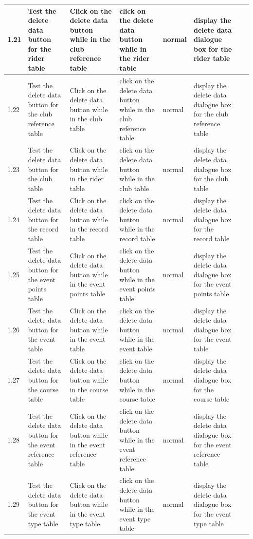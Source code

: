 \begin{landscape}
\begin{center}
\begin{longtable}{|p{1.5cm}|p{2.5cm}|p{2.5cm}|p{2cm}|p{2cm}|p{2cm}|p{2cm}|p{2cm}|}
        1.21 & Test the delete data button for the rider table & Click on the delete data button while in the club reference table & click on the delete data button while in the rider table & normal & display the delete data dialogue box for the rider table & & \\ \hline
        1.22 & Test the delete data button for the club reference table & Click on the delete data button while in the club table & click on the delete data button while in the club reference table & normal & display the delete data dialogue box for the club reference table & & \\ \hline
        1.23 & Test the delete data button for the club  table & Click on the delete data button while in the rider table & click on the delete data button while in the club table & normal & display the delete data dialogue box for the club  table & & \\ \hline
        1.24 & Test the delete data button for the record  table & Click on the delete data button while in the record table & click on the delete data button while in the record table & normal & display the delete data dialogue box for the record  table & & \\ \hline
        1.25 & Test the delete data button for the event points  table & Click on the delete data button while in the event points table & click on the delete data button while in the event points table & normal & display the delete data dialogue box for the event points  table & & \\ \hline
        1.26 & Test the delete data button for the event  table & Click on the delete data button while in the event table & click on the delete data button while in the event table & normal & display the delete data dialogue box for the event  table & & \\ \hline
        1.27 & Test the delete data button for the course  table & Click on the delete data button while in the course table & click on the delete data button while in the course table & normal & display the delete data dialogue box for the course  table & & \\ \hline
        1.28 & Test the delete data button for the event reference  table & Click on the delete data button while in the event reference table & click on the delete data button while in the event reference table & normal & display the delete data dialogue box for the event reference  table & & \\ \hline
        1.29 & Test the delete data button for the event type  table & Click on the delete data button while in the event type table & click on the delete data button while in the event type table & normal & display the delete data dialogue box for the event type  table & & \\ \hline
        

\end{longtable}
\end{center}
\end{landscape}
